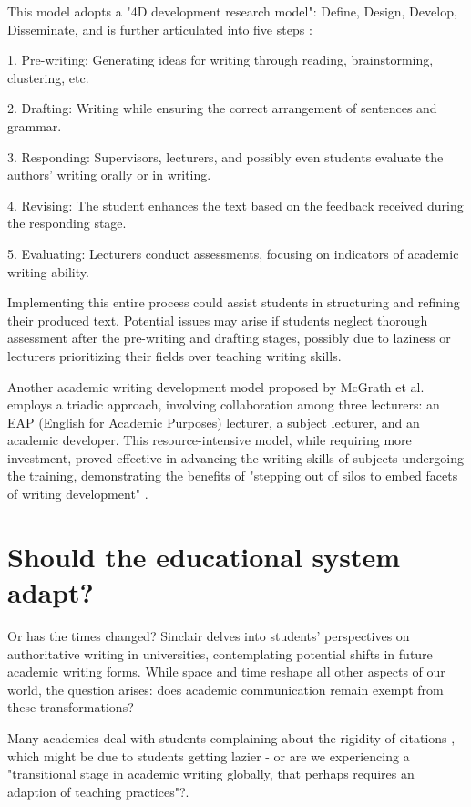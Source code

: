 \documentclass[a4paper,12pt]{article}
\begin{document}
This model adopts a "4D development research model": Define, Design, Develop, Disseminate, and is further articulated into five steps \cite{Source4}:

1. Pre-writing: Generating ideas for writing through reading, brainstorming, clustering, etc.
  
2. Drafting: Writing while ensuring the correct arrangement of sentences and grammar.
  
3. Responding: Supervisors, lecturers, and possibly even students evaluate the authors' writing orally or in writing.
  
4. Revising: The student enhances the text based on the feedback received during the responding stage.
  
5. Evaluating: Lecturers conduct assessments, focusing on indicators of academic writing ability.

Implementing this entire process could assist students in structuring and refining their produced text. Potential issues may arise if students neglect thorough assessment after the pre-writing and drafting stages, possibly due to laziness or lecturers prioritizing their fields over teaching writing skills.

Another academic writing development model proposed by McGrath et al. \cite{Source5} employs a triadic approach, involving collaboration among three lecturers: an EAP (English for Academic Purposes) lecturer, a subject lecturer, and an academic developer. This resource-intensive model, while requiring more investment, proved effective in advancing the writing skills of subjects undergoing the training, demonstrating the benefits of "stepping out of silos to embed facets of writing development" \cite{Source5}.

\section{Should the educational system adapt?}

Or has the times changed? Sinclair \cite{Source1} delves into students' perspectives on authoritative writing in universities, contemplating potential shifts in future academic writing forms. While space and time reshape all other aspects of our world, the question arises: does academic communication remain exempt from these transformations?

Many academics deal with students complaining about the rigidity of citations \cite{Source1}, which might be due to students getting lazier - or are we experiencing a "transitional stage in academic writing globally, that perhaps requires an adaption of teaching practices"?.
\end{document}
